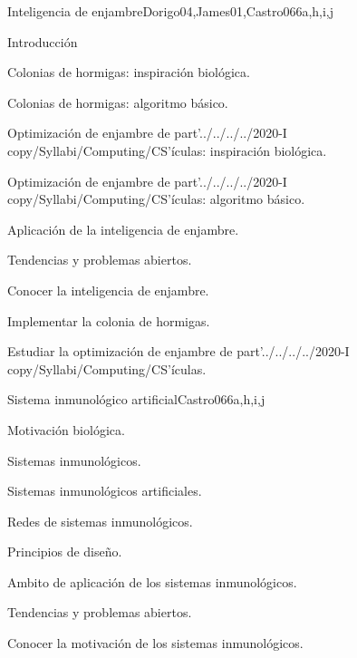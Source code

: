\begin{syllabus}
\begin{unit}{Inteligencia de enjambre}{}{Dorigo04,James01,Castro06}{6}{a,h,i,j}
\begin{topics}
        \item Introducción
        \item Colonias de hormigas: inspiración biológica.
        \item Colonias de hormigas: algoritmo básico.
        \item Optimización de enjambre de part'../../../../2020-I copy/Syllabi/Computing/CS'ículas: inspiración biológica.
        \item Optimización de enjambre de part'../../../../2020-I copy/Syllabi/Computing/CS'ículas: algoritmo básico.
        \item Aplicación de la inteligencia de enjambre.
        \item Tendencias y problemas abiertos.
    \end{topics}
    \begin{learningoutcomes}
        \item Conocer la inteligencia de enjambre.
        \item Implementar la colonia de hormigas.
        \item Estudiar la optimización de enjambre de part'../../../../2020-I copy/Syllabi/Computing/CS'ículas.
    \end{learningoutcomes}
\end{unit}

\begin{unit}{Sistema inmunológico artificial}{}{Castro06}{6}{a,h,i,j}
\begin{topics}
        \item Motivación biológica.
        \item Sistemas inmunológicos.
        \item Sistemas inmunológicos artificiales.
        \item Redes de sistemas inmunológicos.
        \item Principios de diseño.
        \item Ambito de aplicación de los sistemas inmunológicos.
        \item Tendencias y problemas abiertos.
    \end{topics}
    \begin{learningoutcomes}
        \item Conocer la motivación de los sistemas inmunológicos.
    \end{learningoutcomes}
\end{unit}


\end{syllabus}
